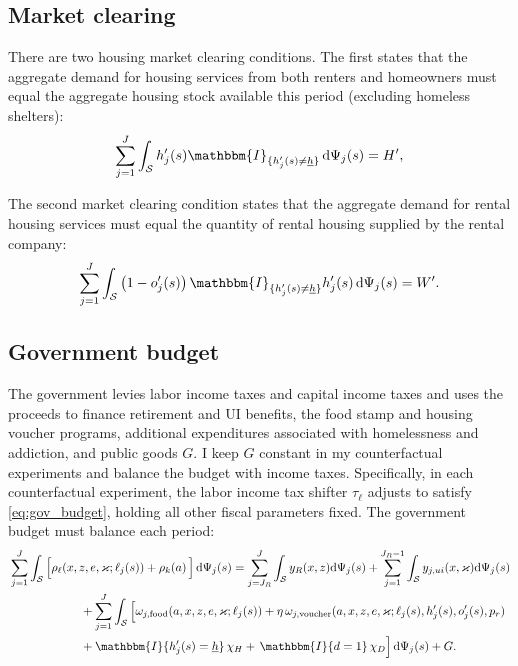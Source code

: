 \documentclass[parskip=full]{article}
\theoremstyle{plain}
\theoremstyle{definition}
\theoremstyle{remark}
\begin{document}
\subsection{Market clearing}\label{sec:mc}

There are two housing market clearing conditions. The first states that the aggregate demand for housing services from both renters and homeowners must equal the aggregate housing stock available this period (excluding homeless shelters):
\begin{equation}
\label{eq:mkt_h}
\sum_{j=1}^J \int_{\mathcal{S}}h'_j(s)\mathbbm{I}_{\{h'_j(s)\neq \underline{h}\}}\,\mathrm{d}\Psi_j(s)=H',
\end{equation}

The second market clearing condition states that the aggregate demand for rental housing services must equal the quantity of rental housing supplied by the rental company:
\begin{equation}
\label{eq:mkt_r}
\sum_{j=1}^J \int_{\mathcal{S}}\big(1-o'_j(s)\big)\, \mathbbm{I}_{\{h'_j(s)\neq \underline{h}\}} h'_j(s)\, \mathrm{d}\Psi_j(s)=W'.
\end{equation}

\subsection{Government budget}\label{sec:gov}

The government levies labor income taxes and capital income taxes and uses the proceeds to finance retirement and UI benefits, the food stamp and housing voucher programs, additional expenditures associated with homelessness and addiction, and public goods $G$. I keep $G$ constant in my counterfactual experiments and balance the budget with income taxes. Specifically, in each counterfactual experiment, the labor income tax shifter $\tau_\ell$ adjusts to satisfy \eqref{eq:gov_budget}, holding all other fiscal parameters 
fixed. The government budget must balance each period:
\begin{equation}
\label{eq:gov_budget}
\begin{aligned}
&\sum_{j=1}^J \int_{\mathcal{S}}\Big[\rho_{\ell}(x,z,e,\varkappa;\ell_j(s))
+\rho_k\!\left(a\right)\Big]\,\mathrm{d}\Psi_j(s)  =
\sum_{j=J_R}^J \int_{\mathcal{S}} y_{R}(x,z)\mathrm{d}\Psi_j(s)+
\sum_{j=1}^{J_{R}-1} \int_{\mathcal{S}}y_{j,ui}(x,\varkappa)\mathrm{d}\Psi_j(s) \\ &\qquad\qquad\qquad +\sum_{j=1}^J \int_{\mathcal{S}}\Big[\omega_{j,\text{food}}(a,x,z,e,\varkappa;\ell_j(s)) + \eta\,\omega_{j,\text{voucher}}(a,x,z,e,\varkappa;\ell_j(s),h'_j(s),o'_{j}(s),p_r)\, \\ &\qquad\qquad\qquad + \mathbbm{I}\{h'_j(s)=\underline h\}\,\chi_H+\,\mathbbm{I}\{d=1\}\,\chi_D
\Big] \,\mathrm{d}\Psi_j(s)+G.
\end{aligned}
\end{equation}
\end{document}
